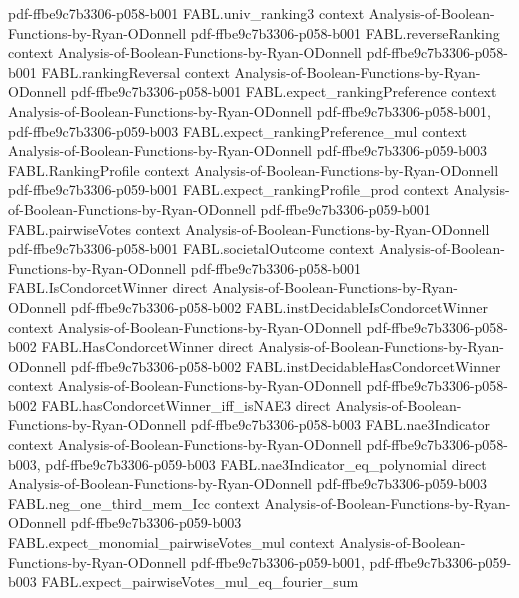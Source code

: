 \begin{theorem}
  {pdf-ffbe9c7b3306-p058-b001}
\proofstep
  {FABL.univ_ranking3}
  {context}
  {Analysis-of-Boolean-Functions-by-Ryan-ODonnell}
  {pdf-ffbe9c7b3306-p058-b001}
\proofstep
  {FABL.reverseRanking}
  {context}
  {Analysis-of-Boolean-Functions-by-Ryan-ODonnell}
  {pdf-ffbe9c7b3306-p058-b001}
\proofstep
  {FABL.rankingReversal}
  {context}
  {Analysis-of-Boolean-Functions-by-Ryan-ODonnell}
  {pdf-ffbe9c7b3306-p058-b001}
\proofstep
  {FABL.expect_rankingPreference}
  {context}
  {Analysis-of-Boolean-Functions-by-Ryan-ODonnell}
  {pdf-ffbe9c7b3306-p058-b001,
    pdf-ffbe9c7b3306-p059-b003}
\proofstep
  {FABL.expect_rankingPreference_mul}
  {context}
  {Analysis-of-Boolean-Functions-by-Ryan-ODonnell}
  {pdf-ffbe9c7b3306-p059-b003}
\proofstep
  {FABL.RankingProfile}
  {context}
  {Analysis-of-Boolean-Functions-by-Ryan-ODonnell}
  {pdf-ffbe9c7b3306-p059-b001}
\proofstep
  {FABL.expect_rankingProfile_prod}
  {context}
  {Analysis-of-Boolean-Functions-by-Ryan-ODonnell}
  {pdf-ffbe9c7b3306-p059-b001}
\proofstep
  {FABL.pairwiseVotes}
  {context}
  {Analysis-of-Boolean-Functions-by-Ryan-ODonnell}
  {pdf-ffbe9c7b3306-p058-b001}
\proofstep
  {FABL.societalOutcome}
  {context}
  {Analysis-of-Boolean-Functions-by-Ryan-ODonnell}
  {pdf-ffbe9c7b3306-p058-b001}
\proofstep
  {FABL.IsCondorcetWinner}
  {direct}
  {Analysis-of-Boolean-Functions-by-Ryan-ODonnell}
  {pdf-ffbe9c7b3306-p058-b002}
\proofstep
  {FABL.instDecidableIsCondorcetWinner}
  {context}
  {Analysis-of-Boolean-Functions-by-Ryan-ODonnell}
  {pdf-ffbe9c7b3306-p058-b002}
\proofstep
  {FABL.HasCondorcetWinner}
  {direct}
  {Analysis-of-Boolean-Functions-by-Ryan-ODonnell}
  {pdf-ffbe9c7b3306-p058-b002}
\proofstep
  {FABL.instDecidableHasCondorcetWinner}
  {context}
  {Analysis-of-Boolean-Functions-by-Ryan-ODonnell}
  {pdf-ffbe9c7b3306-p058-b002}
\proofstep
  {FABL.hasCondorcetWinner_iff_isNAE3}
  {direct}
  {Analysis-of-Boolean-Functions-by-Ryan-ODonnell}
  {pdf-ffbe9c7b3306-p058-b003}
\proofstep
  {FABL.nae3Indicator}
  {context}
  {Analysis-of-Boolean-Functions-by-Ryan-ODonnell}
  {pdf-ffbe9c7b3306-p058-b003,
    pdf-ffbe9c7b3306-p059-b003}
\proofstep
  {FABL.nae3Indicator_eq_polynomial}
  {direct}
  {Analysis-of-Boolean-Functions-by-Ryan-ODonnell}
  {pdf-ffbe9c7b3306-p059-b003}
\proofstep
  {FABL.neg_one_third_mem_Icc}
  {context}
  {Analysis-of-Boolean-Functions-by-Ryan-ODonnell}
  {pdf-ffbe9c7b3306-p059-b003}
\proofstep
  {FABL.expect_monomial_pairwiseVotes_mul}
  {context}
  {Analysis-of-Boolean-Functions-by-Ryan-ODonnell}
  {pdf-ffbe9c7b3306-p059-b001,
    pdf-ffbe9c7b3306-p059-b003}
\proofstep
  {FABL.expect_pairwiseVotes_mul_eq_fourier_sum}

\end{theorem}
